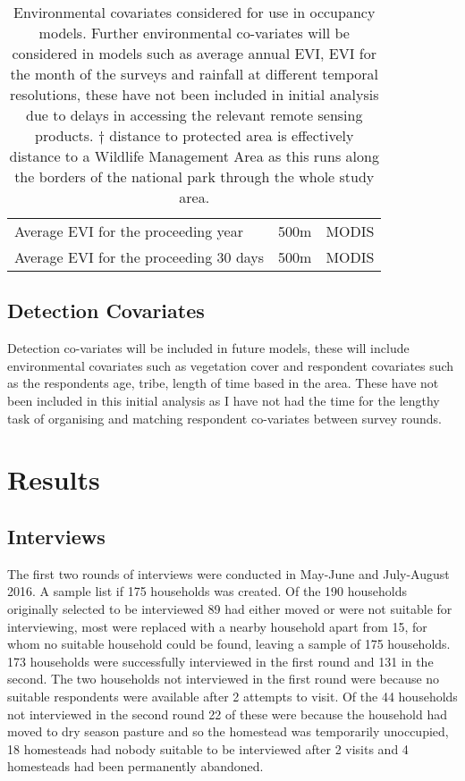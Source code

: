 \begin{table}[h]
\begin{center}
\begin{tabular}{l p{3cm} p{7cm}}
			Average EVI for the proceeding year         & 500m						& MODIS\\			
			Average EVI for the proceeding 30 days      & 500m						& MODIS\\			
			\hline \hline						
		\end{tabular}
		\caption{Environmental covariates considered for use in occupancy models. Further environmental co-variates will be considered in models such as average annual EVI, EVI for the month of the surveys and rainfall at different temporal resolutions, these have not been included in initial analysis due to delays in accessing the relevant remote sensing products. $\dagger$ distance to protected area is effectively distance to a Wildlife Management Area as this runs along the borders of the national park through the whole study area.}
	\label{table:env_covariates}
	\end{center}
\end{table}

\subsection{Detection Covariates}

Detection co-variates will be included in future models, these will include environmental covariates such as vegetation cover and respondent covariates such as the respondents age, tribe, length of time based in the area. These have not been included in this initial analysis as I have not had the time for the lengthy task of organising and matching respondent co-variates between survey rounds.

\section{Results}

\subsection{Interviews}
The first two rounds of interviews were conducted in May-June and July-August 2016. A sample list if 175 households was created. Of the 190 households originally selected to be interviewed 89 had either moved or were not suitable for interviewing, most were replaced with a nearby household apart from 15, for whom no suitable household could be found, leaving a sample of 175 households. 173 households were successfully interviewed in the first round and 131 in the second. The two households not interviewed in the first round were because no suitable respondents were available after 2 attempts to visit. Of the 44 households not interviewed in the second round 22 of these were because the household had moved to dry season pasture and so the homestead was temporarily unoccupied, 18 homesteads had nobody suitable to be interviewed after 2 visits and 4 homesteads had been permanently abandoned.

